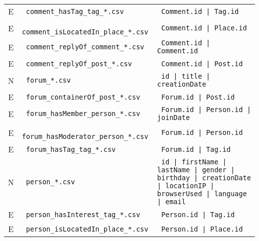 \begin{table}[htb]
\begin{tabularx}{\linewidth}{|>{\sffamily}c|>{\tt}l|>{\tt}X|}
        E                    & comment\_hasTag\_tag\_*.csv             & Comment.id | Tag.id                                                                                        \\
        E                    & comment\_isLocatedIn\_place\_*.csv      & Comment.id | Place.id                                                                                      \\
        E                    & comment\_replyOf\_comment\_*.csv        & Comment.id | Comment.id                                                                                    \\
        E                    & comment\_replyOf\_post\_*.csv           & Comment.id | Post.id                                                                                       \\
        \hline
        N                    & forum\_*.csv                            & id | title | creationDate                                                                                  \\
        E                    & forum\_containerOf\_post\_*.csv         & Forum.id | Post.id                                                                                         \\
        E                    & forum\_hasMember\_person\_*.csv         & Forum.id | Person.id | joinDate                                                               \\
        E                    & forum\_hasModerator\_person\_*.csv      & Forum.id | Person.id                                                                                       \\
        E                    & forum\_hasTag\_tag\_*.csv               & Forum.id | Tag.id                                                                                          \\
        \hline
        N                    & person\_*.csv                           & id | firstName | lastName | gender | birthday | creationDate | locationIP | browserUsed | language | email \\
        E                    & person\_hasInterest\_tag\_*.csv         & Person.id | Tag.id                                                                                         \\
        E                    & person\_isLocatedIn\_place\_*.csv       & Person.id | Place.id                                                                                       \\

\end{tabularx}
\end{table}
